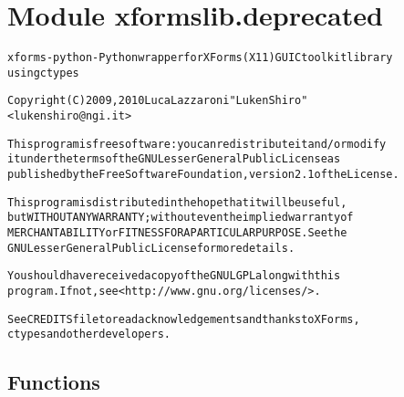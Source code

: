 %
%
%


\section{Module xformslib.deprecated}

    \label{xformslib:deprecated}
\begin{alltt}

xforms-python - Python wrapper for XForms (X11) GUI C toolkit library
using ctypes

Copyright (C) 2009, 2010  Luca Lazzaroni "LukenShiro"
    {\textless}lukenshiro@ngi.it{\textgreater}

This program is free software: you can redistribute it and/or modify
it under the terms of the GNU Lesser General Public License as
published by the Free Software Foundation, version 2.1 of the License.

This program is distributed in the hope that it will be useful,
but WITHOUT ANY WARRANTY; without even the implied warranty of
MERCHANTABILITY or FITNESS FOR A PARTICULAR PURPOSE. See the
GNU Lesser General Public License for more details.

You should have received a copy of the GNU LGPL along with this
program. If not, see {\textless}http://www.gnu.org/licenses/{\textgreater}.

See CREDITS file to read acknowledgements and thanks to XForms,
ctypes and other developers.
\end{alltt}



  \subsection{Functions}

    \label{xformslib:deprecated:warn_deprecated_function}

